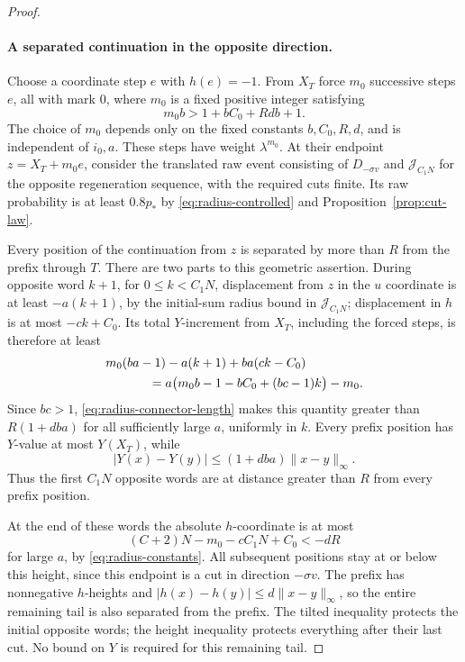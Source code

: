 \begin{proof}
\paragraph{A separated continuation in the opposite direction.}
Choose a coordinate step $e$ with $h(e)=-1$.  From $X_T$ force $m_0$
successive steps $e$, all with mark $0$, where $m_0$ is a fixed positive
integer satisfying
\begin{equation}
  m_0b>1+bC_0+Rdb+1.
  \label{eq:radius-connector-length}
\end{equation}
The choice of $m_0$ depends only on the fixed constants $b,C_0,R,d$,
and is independent of $i_0,a$.
These steps have weight $\lambda^{m_0}$.  At their endpoint
$z=X_T+m_0e$, consider the translated raw event consisting of
$D_{-\sigma v}$ and $\mathcal J_{C_1N}$ for the opposite regeneration
sequence, with the required cuts finite.  Its raw probability is at
least $0.8p_*$ by \eqref{eq:radius-controlled} and
Proposition~\ref{prop:cut-law}.

Every position of the continuation from $z$ is separated by more than
$R$ from the prefix through $T$.  There are two parts to this geometric
assertion.
During opposite word $k+1$, for $0\le k<C_1N$, displacement from $z$
in the $u$ coordinate is at least $-a(k+1)$, by the initial-sum radius
bound in $\mathcal J_{C_1N}$; displacement in $h$ is at most $-ck+C_0$.
Its total $Y$-increment from $X_T$, including
the forced steps, is therefore at least
\begin{align}
  &m_0(ba-1)-a(k+1)+ba(ck-C_0)\notag\\
  &\hspace{12mm}
  =a\bigl(m_0b-1-bC_0+(bc-1)k\bigr)-m_0.
  \label{eq:radius-tilted-gap}
\end{align}
Since $bc>1$, \eqref{eq:radius-connector-length} makes this quantity
greater than $R(1+dba)$ for all sufficiently large $a$, uniformly in
$k$.  Every prefix position has $Y$-value at most $Y(X_T)$, while
\[
  |Y(x)-Y(y)|\le(1+dba)\|x-y\|_\infty.
\]
Thus the first $C_1N$ opposite words are at distance greater than $R$
from every prefix position.

At the end of these words the absolute $h$-coordinate is at most
\begin{equation}
  (C+2)N-m_0-cC_1N+C_0<-dR
  \label{eq:radius-tail-gap}
\end{equation}
for large $a$, by \eqref{eq:radius-constants}.  All subsequent positions
stay at or below this height, since this endpoint is a cut in direction
$-\sigma v$.  The prefix has nonnegative $h$-heights and
$|h(x)-h(y)|\le d\|x-y\|_\infty$, so the entire remaining tail is
also separated from the prefix.  The tilted inequality protects the
initial opposite words; the height inequality protects everything
after their last cut.  No bound on $Y$ is required for this remaining tail.


\end{proof}
